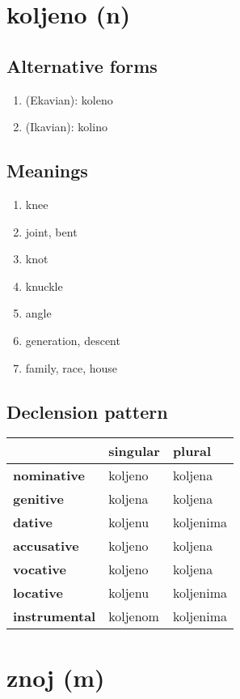 \filbreak
\section{koljeno (n)}
\subsection*{Alternative forms}
\begin{enumerate}
\item (Ekavian): koleno
\item (Ikavian): kolino
\end{enumerate}
\subsection*{Meanings}
\begin{enumerate}
\item knee
\item joint, bent
\item knot
\item knuckle
\item angle
\item generation, descent
\item family, race, house
\end{enumerate}
\subsection*{Declension pattern}
\begin{tabularx}{\linewidth}{Xll}
\toprule
{} &  singular &     plural \\
\midrule
\textbf{nominative  } &   koljeno &    koljena \\
\textbf{genitive    } &   koljena &    koljena \\
\textbf{dative      } &   koljenu &  koljenima \\
\textbf{accusative  } &   koljeno &    koljena \\
\textbf{vocative    } &   koljeno &    koljena \\
\textbf{locative    } &   koljenu &  koljenima \\
\textbf{instrumental} &  koljenom &  koljenima \\
\bottomrule
\end{tabularx}

\filbreak
\section{znoj (m)}
